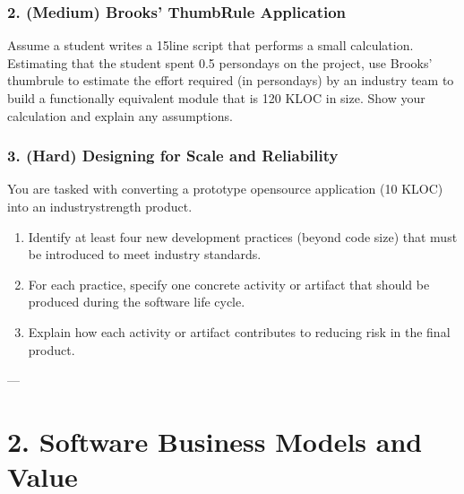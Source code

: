 \documentclass[12pt, a4paper]{article}
\begin{document}
\newpage
\subsubsection{2. (Medium)  \hfill \textbf{Brooks' ThumbRule Application}}
Assume a student writes a 15line script that performs a small calculation. Estimating that the student spent 0.5 persondays on the project, use Brooks' thumbrule to estimate the effort required (in persondays) by an industry team to build a functionally equivalent module that is 120 KLOC in size.  Show your calculation and explain any assumptions.

\newpage
\subsubsection{3. (Hard)  \hfill \textbf{Designing for Scale and Reliability}}
You are tasked with converting a prototype opensource application (10 KLOC) into an industrystrength product.  
\begin{enumerate}[label=(\arabic*)]
  \item Identify at least four new development practices (beyond code size) that must be introduced to meet industry standards.
  \item For each practice, specify one concrete activity or artifact that should be produced during the software life cycle.
  \item Explain how each activity or artifact contributes to reducing risk in the final product.
\end{enumerate}
---

\newpage

\section{2. Software Business Models and Value}
\end{document}
